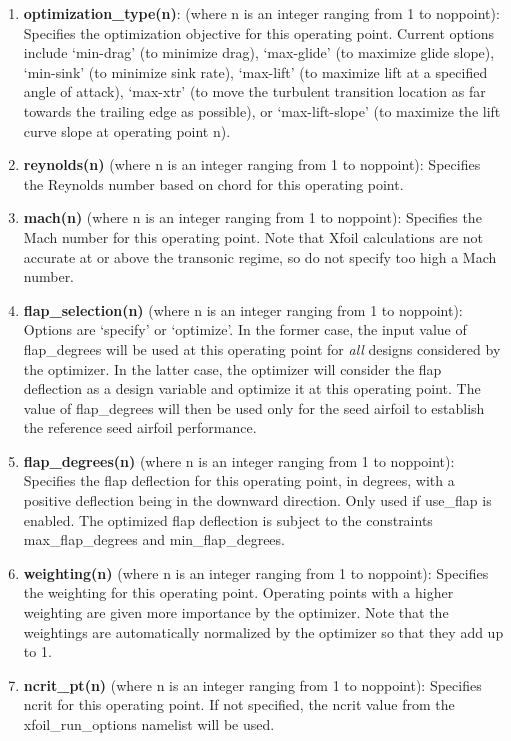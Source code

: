 \documentclass[11pt]{article}
\begin{document}
\begin{enumerate}
{operating point.  Note that Xfoil calculations are not accurate above stall, so do not
specify too large a lift coefficient or angle of attack.}
\item{\textbf{optimization\_type(n)}: (where n is an integer ranging from 1 to
noppoint): Specifies the optimization objective for this operating point. Current options 
include `min-drag' (to minimize drag), `max-glide' (to maximize 
glide slope), `min-sink' (to minimize sink rate), `max-lift' (to maximize lift at a
specified angle of attack), `max-xtr' (to move the turbulent transition location as far
towards the trailing edge as possible), or `max-lift-slope' (to maximize the lift curve
slope at operating point n).}
\item{\textbf{reynolds(n)} (where n is an integer ranging from 1 to noppoint): Specifies
the Reynolds number based on chord for this operating point.}
\item{\textbf{mach(n)} (where n is an integer ranging from 1 to noppoint): Specifies
the Mach number for this operating point.  Note that Xfoil calculations are not accurate
at or above the transonic regime, so do not specify too high a Mach number.}
\item{\textbf{flap\_selection(n)} (where n is an integer ranging from 1 to noppoint):
Options are `specify' or `optimize'.  In the former case, the input value of flap\_degrees
will be used at this operating point for \textit{all} designs considered by the optimizer.
In the latter case, the optimizer will consider the flap deflection as a design variable
and optimize it at this operating point.  The value of flap\_degrees will then be used
only for the seed airfoil to establish the reference seed airfoil performance.}
\item{\textbf{flap\_degrees(n)} (where n is an integer ranging from 1 to noppoint):
Specifies the flap deflection for this operating point, in degrees, with a positive
deflection being in the downward direction. Only used if use\_flap is enabled. The
optimized flap deflection is subject to the constraints max\_flap\_degrees and
min\_flap\_degrees.}
\item{\textbf{weighting(n)} (where n is an integer ranging from 1 to noppoint): Specifies
the weighting for this operating point.  Operating points with a higher weighting are
given more importance by the optimizer.  Note that the weightings are automatically 
normalized by the optimizer so that they add up to 1.}
\item{\textbf{ncrit\_pt(n)} (where n is an integer ranging from 1 to noppoint): Specifies
ncrit for this operating point. If not specified, the ncrit value from the
xfoil\_run\_options namelist will be used.}
\end{enumerate}
\end{document}
